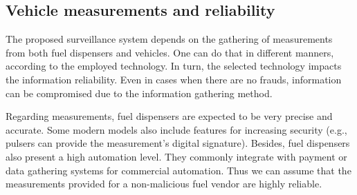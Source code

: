 \documentclass[sigplan]{acmart}
\begin{document}
\subsection{Vehicle measurements and reliability}
The proposed surveillance system depends on the gathering of measurements from both fuel dispensers and vehicles.
One can do that in different manners, according to the employed technology.
In turn, the selected technology impacts the information reliability.
Even in cases when there are no frauds, information can be compromised due to the information gathering method.

Regarding measurements, fuel dispensers are expected to be very precise and accurate.
Some modern models also include features for increasing security (e.g., pulsers can provide the measurement's digital signature).
Besides, fuel dispensers also present a high automation level.
They commonly integrate with payment or data gathering systems for commercial automation.
Thus we can assume that the measurements provided for a non-malicious fuel vendor are highly reliable.
\end{document}

